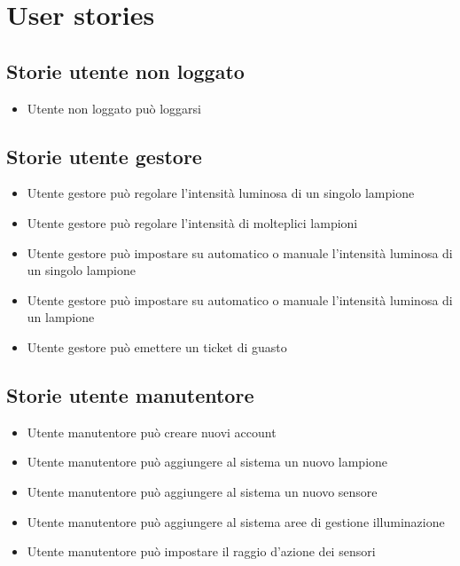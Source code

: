 \chapter{User stories}

\section{Storie utente non loggato}

\begin{itemize}
    \item Utente non loggato può loggarsi
\end{itemize}

\section{Storie utente gestore}

\begin{itemize}
    \item Utente gestore può regolare l'intensità luminosa di un singolo lampione
    \item Utente gestore può regolare l'intensità di molteplici lampioni
    \item Utente gestore può impostare su automatico o manuale l'intensità luminosa di un singolo lampione
    \item Utente gestore può impostare su automatico o manuale l'intensità luminosa di un lampione
    \item Utente gestore può emettere un ticket di guasto
\end{itemize}



\section{Storie utente manutentore}
\begin{itemize}
    \item Utente manutentore può creare nuovi account
    \item Utente manutentore può aggiungere al sistema un nuovo lampione
    \item Utente manutentore può aggiungere al sistema un nuovo sensore
    \item Utente manutentore può aggiungere al sistema aree di gestione illuminazione
    \item Utente manutentore può impostare il raggio d'azione dei sensori
\end{itemize}


